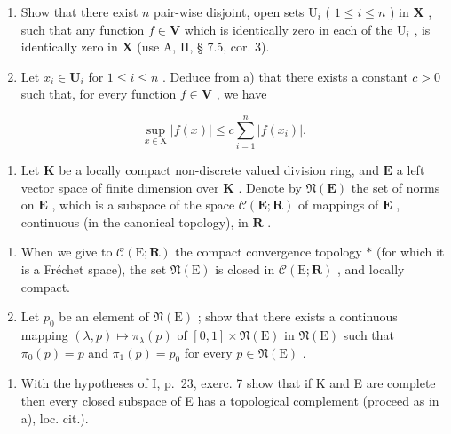 \begin{enumerate}
\def\labelenumi{\alph{enumi})}
\item
  Show that there exist \(n\) pair-wise disjoint, open sets \(\mathrm{U}_i\) ( \(1 \leqslant i \leqslant n\) ) in \(\mathbf{X}\) , such that any function \(f \in \mathbf{V}\) which is identically zero in each of the \(\mathrm{U}_i\) , is identically zero in \(\mathbf{X}\) (use A, II, § 7.5, cor. 3).
\item
  Let \(x_{i} \in \mathbf{U}_{i}\) for \(1 \leqslant i \leqslant n\) . Deduce from a) that there exists a constant \(c > 0\) such that, for every function \(f \in \mathbf{V}\) , we have
\end{enumerate}

\[
\sup _ {x \in \mathrm{X}} | f (x) | \leqslant c \sum_ {i = 1} ^ {n} | f (x _ {i}) |.
\]

\begin{enumerate}
\def\labelenumi{\arabic{enumi})}
\setcounter{enumi}{9}
\tightlist
\item
  Let \(\mathbf{K}\) be a locally compact non-discrete valued division ring, and \(\mathbf{E}\) a left vector space of finite dimension over \(\mathbf{K}\) . Denote by \(\mathfrak{N}(\mathbf{E})\) the set of norms on \(\mathbf{E}\) , which is a subspace of the space \(\mathcal{C}(\mathbf{E};\mathbf{R})\) of mappings of \(\mathbf{E}\) , continuous (in the canonical topology), in \(\mathbf{R}\) .
\end{enumerate}

\begin{enumerate}
\def\labelenumi{\alph{enumi})}
\item
  When we give to \(\mathcal{C}(\mathrm{E};\mathbf{R})\) the compact convergence topology \(*\) (for which it is a Fréchet space), the set \(\mathfrak{N}(\mathrm{E})\) is closed in \(\mathcal{C}(\mathrm{E};\mathbf{R})\) , and locally compact.
\item
  Let \(p_0\) be an element of \(\mathfrak{N}(\mathrm{E})\) ; show that there exists a continuous mapping \((\lambda, p) \mapsto \pi_{\lambda}(p)\) of \([0, 1] \times \mathfrak{N}(\mathrm{E})\) in \(\mathfrak{N}(\mathrm{E})\) such that \(\pi_0(p) = p\) and \(\pi_1(p) = p_0\) for every \(p \in \mathfrak{N}(\mathrm{E})\) .
\end{enumerate}

\begin{enumerate}
\def\labelenumi{\arabic{enumi})}
\setcounter{enumi}{10}
\tightlist
\item
  With the hypotheses of I, p.~23, exerc. 7 show that if K and E are complete then every closed subspace of E has a topological complement (proceed as in a), loc. cit.).
\end{enumerate}

